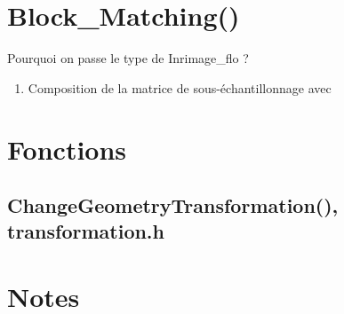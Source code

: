 \documentclass[10pt]{report}
\begin{document}
\section{Block\_Matching()}

Pourquoi on passe le type de Inrimage\_flo ?

\begin{enumerate}

\item Composition de la matrice de sous-\'echantillonnage avec 

\end{enumerate}




\section{Fonctions}

\subsection{ChangeGeometryTransformation(), transformation.h}

\section{Notes}
\end{document}
